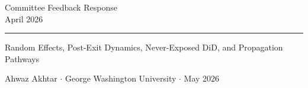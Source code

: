 \documentclass[aspectratio=169,11pt]{beamer}
\begin{document}
\begingroup
{}
\begin{frame}[plain]
  \vspace{0.9cm}
  \hspace{0.6cm}%
  {\color{white}\bfseries\fontsize{22}{28}\selectfont
    \parbox{13cm}{Committee Feedback Response\\April 2026}}
  \par\vspace{0.45em}
  \hspace{0.6cm}%
  {\color{WarmOrange}\rule{12cm}{2pt}}
  \par\vspace{0.45em}
  \hspace{0.6cm}%
  {\color{Teal}\normalsize Random Effects, Post-Exit Dynamics, Never-Exposed DiD, and Propagation Pathways}
  \par\vspace{0.35em}
  \hspace{0.6cm}%
  {\color{WarmGray}\small Ahwaz Akhtar \(\cdot\) George Washington University \(\cdot\) May 2026}
\end{frame}
\endgroup
\end{document}
